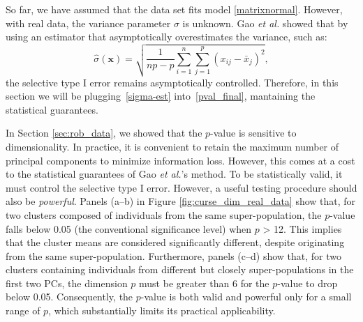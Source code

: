 \documentclass[a4paper,11pt]{article}
\theoremstyle{plain}
\newcommand{\1}{\mathbf{1}}
\begin{document}
So far, we have assumed that the data set fits model \eqref{matrixnormal}. However, with real data, the variance parameter $\sigma$ is unknown. Gao \textit{et al.} showed that  \cite[Theorem 4]{Gao} by using an estimator that asymptotically overestimates the variance, such as:
\begin{equation}\label{sigma-est}
  \hat{\sigma}(\mathbf{x}) = \sqrt{\frac{1}{np - p}\sum_{i=1}^{n}\sum_{j=1}^{p}(x_{ij} - \bar{x}_j)^2},
\end{equation}
the selective type I error remains asymptotically controlled. Therefore, in this section we will be plugging~\eqref{sigma-est} into~\eqref{pval_final}, mantaining the statistical guarantees.

In Section \ref{sec:rob_data}, we showed that the $p$-value is sensitive to dimensionality.
In practice, it is convenient to retain the maximum number of principal components to minimize information loss. However, this comes at a cost to the statistical guarantees of Gao \textit{et al.}’s method. To be statistically valid, it must control the selective type I error. However, a useful testing procedure should also be \textit{powerful}. Panels (a--b) in Figure \ref{fig:curse_dim_real_data} show that, for two clusters composed of individuals from the same super-population, the $p$-value falls below 0.05 (the conventional significance level) when $p$ > 12. This implies that the cluster means are considered significantly different, despite originating from the same super-population.
Furthermore, panels (c--d) show that, for two clusters containing individuals from different but closely super-populations in the first two PCs, the dimension $p$ must be greater than 6 for the $p$-value to drop below 0.05. Consequently, the $p$-value is both valid and powerful only for a small range of $p$, which substantially limits its practical applicability.
\end{document}
